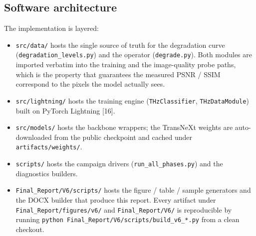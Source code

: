 \subsection{Software architecture}
\label{sec:design:sw}

The implementation is layered:

\begin{itemize}
  \item \texttt{src/data/} hosts the single source of truth for the
        degradation curve (\texttt{degradation\_levels.py}) and the operator
        (\texttt{degrade.py}). Both modules are imported verbatim into the
        training and the image-quality probe paths, which is the property
        that guarantees the measured PSNR / SSIM correspond to the pixels
        the model actually sees.
  \item \texttt{src/lightning/} hosts the training engine
        (\texttt{THzClassifier}, \texttt{THzDataModule}) built on PyTorch
        Lightning [16].
  \item \texttt{src/models/} hosts the backbone wrappers; the TransNeXt
        weights are auto-downloaded from the public checkpoint and cached
        under \texttt{artifacts/weights/}.
  \item \texttt{scripts/} hosts the campaign drivers
        (\texttt{run\_all\_phases.py}) and the diagnostics builders.
  \item \texttt{Final\_Report/V6/scripts/} hosts the figure / table / sample
        generators and the DOCX builder that produce this report. Every
        artifact under \texttt{Final\_Report/figures/v6/} and
        \texttt{Final\_Report/V6/} is reproducible by running
        \texttt{python Final\_Report/V6/scripts/build\_v6\_*.py} from a
        clean checkout.
\end{itemize}
